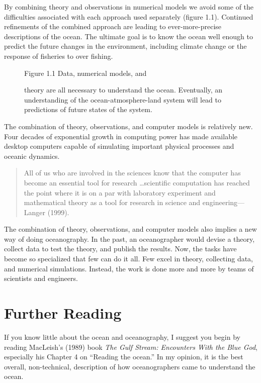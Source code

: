 By combining theory and observations in numerical models we avoid some of the
difficulties associated with each approach used separately (figure 1.1). Continued
refinements of the combined approach are leading to ever-more-precise descriptions of
the ocean. The ultimate goal is to know the ocean well enough to predict the future
changes in the environment, including climate change or the response of fisheries to
over fishing.

\begin{figure}[h!]
\footnotesize
Figure 1.1 Data, numerical models, and \rule{0mm}{4ex}theory are
all necessary to understand the ocean. Eventually, an
understanding of the ocean-atmosphere-land system will lead to
predictions of future states of the system.

\label{fig:bigpicture}
\vspace{-1ex}
\end{figure}

The combination of theory, observations, and computer
models is relatively new. Four decades of
exponential growth in computing power has made available desktop
computers capable of simulating important physical processes and
oceanic dynamics.
\begin{quote} \small
All of us who are involved in the sciences know that the computer has become
an essential tool for research \dots scientific computation has reached the point where
it is on a par with laboratory experiment and mathematical theory as a tool for research
in science and engineering---Langer (1999).
\end{quote}

The  combination of theory, observations, and computer models also
implies a new way of doing oceanography. In the past, an oceanographer would devise a theory,
collect data to test the theory, and publish the results. Now, the
tasks have become so specialized that few can do it all. Few excel
in theory, collecting data, and numerical simulations. Instead,
the work is done more and more by teams of scientists and
engineers.

\section{Further Reading}
If you know little about the ocean and oceanography, I suggest you begin by
reading MacLeish's (1989) book \textit{The Gulf Stream: Encounters With the
Blue God}, especially his Chapter 4 on ``Reading the ocean.'' In my
opinion, it is the best overall, non-technical, description of how oceanographers
came to understand the ocean.


